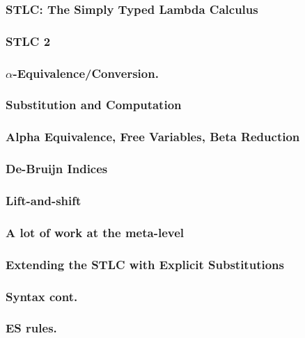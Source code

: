 \documentclass
  [hyperref={colorlinks = true,linkcolor = blue, 
             citecolor = blue, urlcolor = blue}
  ]{beamer}
\newcommand{\SlidePath}[1]{./Slides/#1}
\begin{document}
\begin{frame}[fragile]
  \frametitle{The Function Term Elimination Rule}
    }
\end{frame}

\begin{frame}[fragile]
  \frametitle{STLC: The Simply Typed Lambda Calculus}
\end{frame}

\begin{frame}[fragile]
  \frametitle{STLC 2}
\end{frame}

\begin{frame}[fragile]
  \frametitle{$\alpha$-Equivalence/Conversion.}
\end{frame}

\begin{frame}[fragile]
  \frametitle{Substitution and Computation}
\end{frame}

\begin{frame}[fragile]
  \frametitle{Alpha Equivalence, Free Variables, Beta Reduction}
\end{frame}

\begin{frame}[fragile]
  \frametitle{De-Bruijn Indices}
\end{frame}

\begin{frame}[fragile]
  \frametitle{Lift-and-shift}
\end{frame}

\begin{frame}[fragile]
  \frametitle{A lot of work at the meta-level}
\end{frame}

\begin{frame}[fragile]
  \frametitle{Explicit Substitutions (Paper)}
  }
\end{frame}

\begin{frame}[fragile]
  \frametitle{Extending the STLC with Explicit Substitutions}
\end{frame}

\begin{frame}[fragile]
  \frametitle{Syntax cont.}
\end{frame}

\begin{frame}[fragile]
  \frametitle{ES rules.}
\end{frame}
\end{document}
